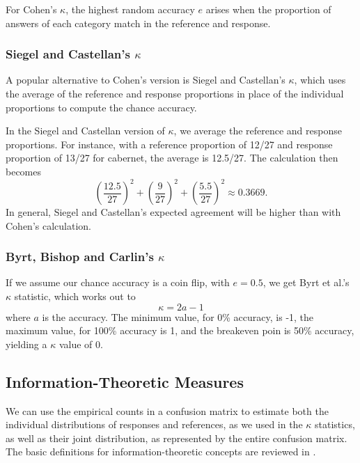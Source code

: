 For Cohen's $\kappa$, the highest random accuracy $e$ arises when the
proportion of answers of each category match in the reference and response.

\subsubsection{Siegel and Castellan's $\kappa$}

A popular alternative to Cohen's version is Siegel and Castellan's
$\kappa$, which uses the average of the reference and response
proportions in place of the individual proportions to compute the
chance accuracy.

In the Siegel and Castellan version of $\kappa$, we average the
reference and response proportions.  For instance, with a reference
proportion of 12/27 and response proportion of 13/27 for cabernet,
the average is 12.5/27. The calculation then becomes
%
\begin{equation}
\left( \frac{12.5}{27} \right)^2
+ \left( \frac{9}{27} \right)^2
+ \left( \frac{5.5}{27} \right)^2
\approx 0.3669.
\end{equation}
%
In general, Siegel and Castellan's expected agreement will be higher
than with Cohen's calculation.


\subsubsection{Byrt, Bishop and Carlin's $\kappa$}

If we assume our chance accuracy is a coin flip, with $e = 0.5$, 
we get Byrt et al.'s $\kappa$ statistic, which works out to
%
\begin{equation}
\kappa = 2 a - 1
\end{equation}
%
where $a$ is the accuracy.  The minimum value, for 0\% accuracy, is
-1, the maximum value, for 100\% accuracy is 1, and the breakeven poin
is 50\% accuracy, yielding a $\kappa$ value of 0.


\subsection{Information-Theoretic Measures}

We can use the empirical counts in a confusion matrix to estimate both
the individual distributions of responses and references, as we used
in the $\kappa$ statistics, as well as their joint distribution, as
represented by the entire confusion matrix.  The basic definitions for
information-theoretic concepts are reviewed in
.

